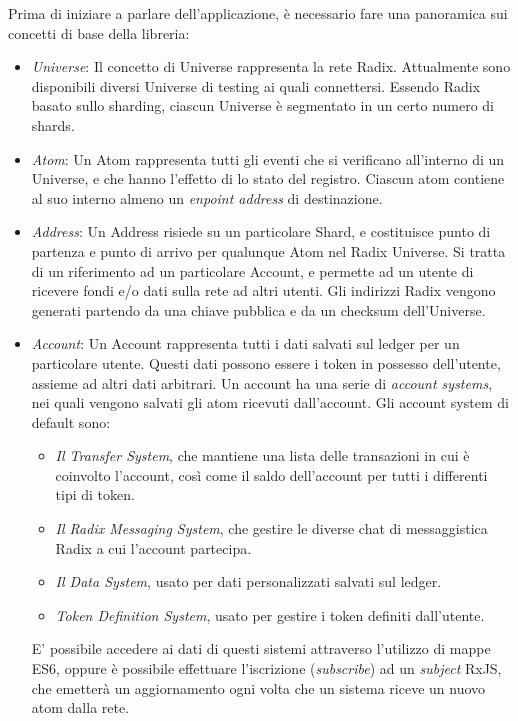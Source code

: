Prima di iniziare a parlare dell'applicazione, è necessario fare una panoramica sui concetti di base della libreria:
\begin{itemize}
    \item \textit{Universe}: Il concetto di Universe rappresenta la rete Radix. Attualmente sono disponibili diversi Universe di testing ai quali connettersi. Essendo Radix basato sullo sharding, ciascun Universe è segmentato in un certo numero di shards.
    \item \textit{Atom}: Un Atom rappresenta tutti gli eventi che si verificano all'interno di un Universe, e che hanno l'effetto di lo stato del registro. Ciascun atom contiene al suo interno almeno un \textit{enpoint address} di destinazione.
    \item \textit{Address}: Un Address risiede su un particolare Shard, e costituisce punto di partenza e punto di arrivo per qualunque Atom nel Radix Universe. Si tratta di un riferimento ad un particolare Account, e permette ad un utente di ricevere fondi e/o dati sulla rete ad altri utenti. Gli indirizzi Radix vengono generati partendo da una chiave pubblica e da un checksum dell'Universe. 
    \item \textit{Account}: Un Account rappresenta tutti i dati salvati sul ledger per un particolare utente. Questi dati possono essere i token in possesso dell'utente, assieme ad altri dati arbitrari. Un account ha una serie di \textit{account systems}, nei quali vengono salvati gli atom ricevuti dall'account. Gli account system di default sono:
    \begin{itemize}
        \item \textit{Il Transfer System}, che mantiene una lista delle transazioni in cui è coinvolto l'account, così come il saldo dell'account per tutti i differenti tipi di token.
        \item \textit{Il Radix Messaging System}, che gestire le diverse chat di messaggistica Radix a cui l'account partecipa.
        \item \textit{Il Data System}, usato per dati personalizzati salvati sul ledger.
        \item \textit{Token Definition System}, usato per gestire i token definiti dall'utente.
    \end{itemize}
    E' possibile accedere ai dati di questi sistemi attraverso l'utilizzo di mappe ES6, oppure è possibile effettuare l'iscrizione (\textit{subscribe}) ad un \textit{subject} RxJS, che emetterà un aggiornamento ogni volta che un sistema riceve un nuovo atom dalla rete.

\end{itemize}
